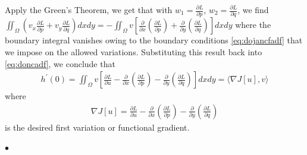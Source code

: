 \documentclass{article}
\begin{document}
Apply the Green's Theorem, we get that with $w_{1}=\frac{\partial L}{\partial p}$, $w_{2}=\frac{\partial L}{\partial q}$, we find $\iint_{\Omega}\left(v_{x} \frac{\partial L}{\partial p}+v_{y} \frac{\partial L}{\partial q}\right) d x d y=-\iint_{\Omega} v\left[\frac{\partial}{\partial x}\left(\frac{\partial L}{\partial p}\right)+\frac{\partial}{\partial y}\left(\frac{\partial L}{\partial q}\right)\right] d x d y$
where the boundary integral vanishes owing to the boundary conditions \cref{eq:dojancfadf} that we impose on the allowed variations. Substituting this result back into \cref{eq:doncadf}, we conclude that
\begin{align*}
h^{\prime}(0)=\iint_{\Omega} v\left[\frac{\partial L}{\partial u}-\frac{\partial}{\partial x}\left(\frac{\partial L}{\partial p}\right)-\frac{\partial}{\partial y}\left(\frac{\partial L}{\partial q}\right)\right] d x d y=\langle\nabla J[u], v\rangle
\end{align*}
where
\begin{align*}
\nabla J[u]=\frac{\partial L}{\partial u}-\frac{\partial}{\partial x}\left(\frac{\partial L}{\partial p}\right)-\frac{\partial}{\partial y}\left(\frac{\partial L}{\partial q}\right)
\end{align*}
is the desired first variation or functional gradient. 

$\bullet$ 
\end{document}
